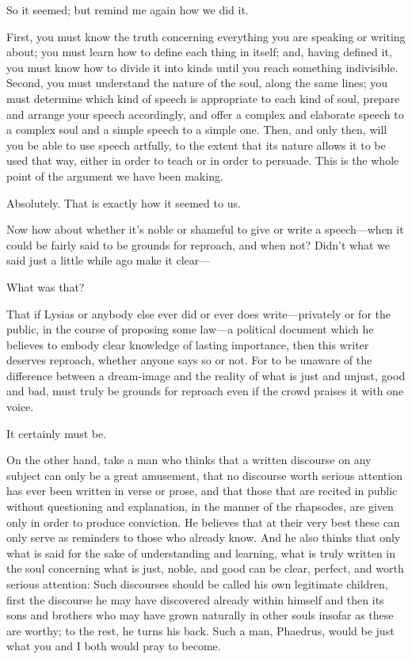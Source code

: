 \sayphaedrus So it seemed; but remind me again how we did it.

\saysocrates First, you must know the truth concerning everything you are
speaking or writing about; you must learn how to define each thing in
itself; and, having defined it, you must know how to divide it into
kinds until you reach something indivisible. Second, you must understand
the nature of the soul, along the same lines; you must determine which
kind of speech is appropriate to each kind of soul, prepare and
arrange your speech accordingly, and offer a complex and elaborate
speech to a complex soul and a simple speech to a simple one. Then, and
only then, will you be able to use speech artfully, to the extent that
its nature allows it to be used that way, either in order to teach or in
order to persuade. This is the whole point of the argument we have been
making.

\sayphaedrus Absolutely. That is exactly how it seemed to us.

\saysocrates Now how about whether it's noble or shameful to give
or write a speech---when it could be fairly said to be grounds for
reproach, and when not? Didn't what we said just a little while ago make
it clear---

\sayphaedrus What was that?

\saysocrates That if Lysias or anybody else ever did or ever does
write---privately or for the public, in the course of proposing some
law---a political document which he believes to embody clear knowledge
of lasting importance, then this writer deserves reproach, whether
anyone says so or not. For to be unaware of the difference between a
dream-image and the reality of what is just and unjust, good and
bad, must truly be grounds for reproach even if the crowd praises it
with one voice.

\sayphaedrus It certainly must be.

\saysocrates On the other hand, take a man who thinks that a written
discourse on any subject can only be a great amusement, that no
discourse worth serious attention has ever been written in verse or
prose, and that those that are recited in public without questioning and
explanation, in the manner of the rhapsodes, are given
only in order to produce conviction. He believes that at their very best
these can only serve as reminders to those who already know. And he also
thinks that only what is said for the sake of understanding and
learning, what is truly written in the soul concerning what is just,
noble, and good can be clear, perfect, and worth serious attention: Such
discourses should be called his own legitimate children, first the
discourse he may have discovered already within himself and then
its sons and brothers who may have grown naturally in other souls
insofar as these are worthy; to the rest, he turns his back. Such a man,
Phaedrus, would be just what you and I both would pray to become.

